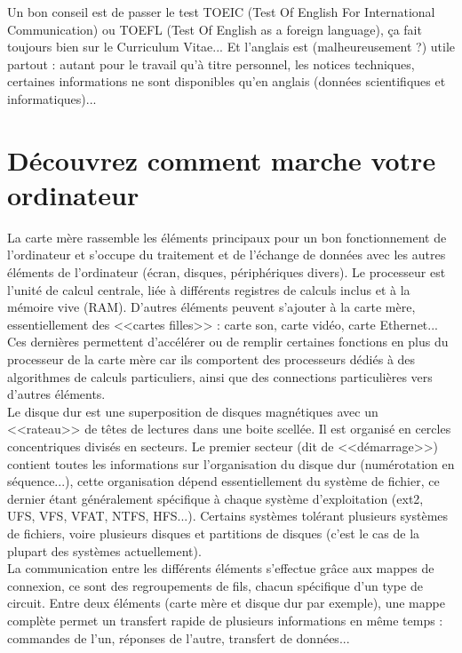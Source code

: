 \documentclass[11pt,twoside,a4paper]{article}
\begin{document}
	Un bon conseil est de passer le test TOEIC (Test Of English For International Communication) ou TOEFL (Test Of English as a foreign language), \c{c}a fait toujours bien sur le Curriculum Vitae... Et l'anglais est (malheureusement ?) utile partout : autant pour le travail qu'{\`a} titre personnel, les notices techniques, certaines informations ne sont disponibles qu'en anglais (donn{\'e}es scientifiques et informatiques)...~\\

\section{D{\'e}couvrez comment marche votre ordinateur}
		La carte m{\`e}re rassemble les {\'e}l{\'e}ments principaux pour un bon fonctionnement de l'ordinateur et s'occupe du traitement et de l'{\'e}change de donn{\'e}es avec les autres {\'e}l{\'e}ments de l'ordinateur ({\'e}cran, disques, p{\'e}riph{\'e}riques divers). Le processeur est l'unit{\'e} de calcul centrale, li{\'e}e {\`a} diff{\'e}rents registres de calculs inclus et {\`a} la m{\'e}moire vive (RAM). D'autres {\'e}l{\'e}ments peuvent s'ajouter {\`a} la carte m{\`e}re, essentiellement des <<cartes filles>> : carte son, carte vid{\'e}o, carte Ethernet... Ces derni{\`e}res permettent d'acc{\'e}l{\'e}rer ou de remplir certaines fonctions en plus du processeur de la carte m{\`e}re car ils comportent des processeurs d{\'e}di{\'e}s {\`a} des algorithmes de calculs particuliers, ainsi que des connections particuli{\`e}res vers d'autres {\'e}l{\'e}ments. ~\\

		Le disque dur est une superposition de disques magn{\'e}tiques avec un <<rateau>> de t{\^e}tes de lectures dans une boite scell{\'e}e. Il est organis{\'e} en cercles concentriques divis{\'e}s en secteurs. Le premier secteur (dit de <<d{\'e}marrage>>) contient toutes les informations sur l'organisation du disque dur (num{\'e}rotation en s{\'e}quence...), cette organisation d{\'e}pend essentiellement du syst{\`e}me de fichier, ce dernier {\'e}tant g{\'e}n{\'e}ralement sp{\'e}cifique {\`a} chaque syst{\`e}me d'exploitation (ext2, UFS, VFS, VFAT, NTFS, HFS...). Certains syst{\`e}mes tol{\'e}rant plusieurs syst{\`e}mes de fichiers, voire plusieurs disques et partitions de disques (c'est le cas de la plupart des syst{\`e}mes actuellement). ~\\

		La communication entre les diff{\'e}rents {\'e}l{\'e}ments s'effectue gr{\^a}ce aux mappes de connexion, ce sont des regroupements de fils, chacun sp{\'e}cifique d'un type de circuit. Entre deux {\'e}l{\'e}ments (carte m{\`e}re et disque dur par exemple), une mappe compl{\`e}te permet un transfert rapide de plusieurs informations en m{\^e}me temps : commandes de l'un, r{\'e}ponses de l'autre, transfert de donn{\'e}es... 
\end{document}
